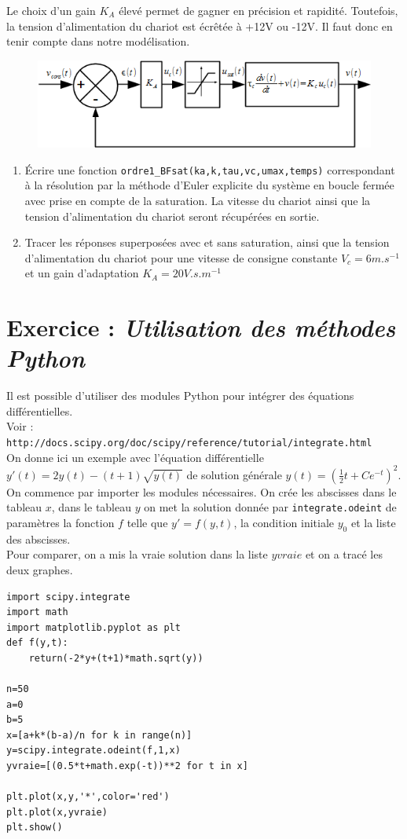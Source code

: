 \documentclass[10pt]{article}
\begin{document}
Le choix d'un gain $K_A$ \'elev\'e permet de gagner en pr\'ecision et rapidit\'e. Toutefois, la tension d'alimentation du chariot est \'ecr\^et\'ee \`a +12V ou -12V. Il faut donc en tenir compte dans notre mod\'elisation.

\begin{figure}[!hbt]
\begin{center}
\includegraphics[width=12cm]{images/BF_sat.png}
\end{center}
\end{figure}

\begin{enumerate}
\item \'Ecrire une fonction {\tt ordre1\_BFsat(ka,k,tau,vc,umax,temps)} correspondant \`a la r\'esolution par la m\'ethode d'Euler explicite du syst\`eme en boucle ferm\'ee avec prise en compte de la saturation. La vitesse du chariot ainsi que la tension d'alimentation du chariot seront r\'ecup\'er\'ees en sortie.
\item  Tracer les r\'eponses superpos\'ees avec et sans saturation, ainsi que la tension d'alimentation du chariot pour une vitesse de consigne constante $V_c=6m.s^{-1}$ et un gain d'adaptation $K_A=20 V.s.m^{-1}$
\end{enumerate}



\section{Exercice : {\it Utilisation des m\'ethodes Python}}
Il est possible d'utiliser des modules Python pour int\'egrer des \'equations diff\'erentielles. \\
Voir : {\tt http://docs.scipy.org/doc/scipy/reference/tutorial/integrate.html}\\
On donne ici un exemple avec l'\'equation diff\'erentielle $y'(t)=2y(t)-(t+1)\sqrt{y(t)}$ de solution g\'en\'erale $y(t)=(\frac12 t+Ce^{-t})^2.$\\ On commence par importer les modules n\'ecessaires. 
On cr\'ee les abscisses dans le tableau $x$, dans le tableau $y$ on met la solution donn\'ee par {\tt integrate.odeint} de param\`etres la fonction $f$ telle que $y'=f(y,t)$, la condition initiale $y_0$ et la liste des abscisses.\\
Pour comparer, on a mis la vraie solution dans la liste $yvraie$ et on a trac\'e les deux graphes.
\begin{verbatim}
import scipy.integrate
import math
import matplotlib.pyplot as plt
def f(y,t):
    return(-2*y+(t+1)*math.sqrt(y))

n=50
a=0
b=5
x=[a+k*(b-a)/n for k in range(n)]
y=scipy.integrate.odeint(f,1,x)
yvraie=[(0.5*t+math.exp(-t))**2 for t in x]

plt.plot(x,y,'*',color='red')
plt.plot(x,yvraie)
plt.show()
\end{verbatim}
\end{document}
